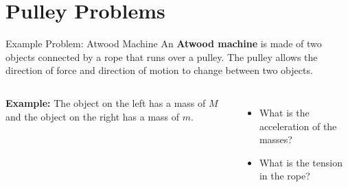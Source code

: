 \documentclass[12pt,compress,aspectratio=169]{beamer}
\begin{document}
\section{Pulley Problems}

\begin{frame}{Example Problem: Atwood Machine}
  An \textbf{Atwood machine} is made of two objects connected by a rope that
  runs over a pulley. The pulley allows the direction of force and direction
  of motion to change between two objects.
  \begin{columns}
    \centering

    \textbf{Example:} The object on the left has a mass of $M$ and the object
    on the right has a mass of $m$.
    \begin{itemize}
    \item What is the acceleration of the masses?
    \item What is the tension in the rope?
    \end{itemize}
  \end{columns}
\end{frame}


%    
%
%
%
%
%    
\end{document}
